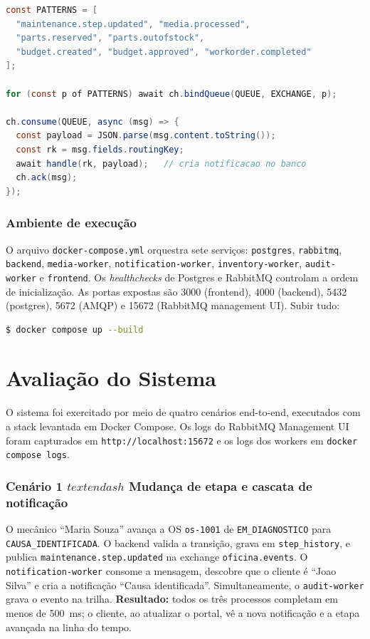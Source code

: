 \documentclass[10pt,a4paper]{article}
\begin{document}
\begin{lstlisting}[language=Java,caption={Notification worker (trecho)},label=lst:notif]
const PATTERNS = [
  "maintenance.step.updated", "media.processed",
  "parts.reserved", "parts.outofstock",
  "budget.created", "budget.approved", "workorder.completed"
];

for (const p of PATTERNS) await ch.bindQueue(QUEUE, EXCHANGE, p);

ch.consume(QUEUE, async (msg) => {
  const payload = JSON.parse(msg.content.toString());
  const rk = msg.fields.routingKey;
  await handle(rk, payload);   // cria notificacao no banco
  ch.ack(msg);
});
\end{lstlisting}

\subsubsection*{Ambiente de execu\c{c}\~ao}

O arquivo \texttt{docker-compose.yml} orquestra sete servi\c{c}os: \texttt{postgres}, \texttt{rabbitmq}, \texttt{backend}, \texttt{media-worker}, \texttt{notification-worker}, \texttt{inventory-worker}, \texttt{audit-worker} e \texttt{frontend}. Os \emph{healthchecks} de Postgres e RabbitMQ controlam a ordem de inicializa\c{c}\~ao. As portas expostas s\~ao 3000 (frontend), 4000 (backend), 5432 (postgres), 5672 (AMQP) e 15672 (RabbitMQ management UI). Subir tudo:
\begin{lstlisting}[language=bash]
$ docker compose up --build
\end{lstlisting}

\section{Avalia\c{c}\~ao do Sistema}

O sistema foi exercitado por meio de quatro cen\'arios end-to-end, executados com a stack levantada em Docker Compose. Os logs do RabbitMQ Management UI foram capturados em \texttt{http://localhost:15672} e os logs dos workers em \texttt{docker compose logs}.

\subsubsection*{Cen\'ario 1 \(textendash\) Mudan\c{c}a de etapa e cascata de notifica\c{c}\~ao}

O mec\^anico ``Maria Souza'' avan\c{c}a a OS \texttt{os-1001} de \texttt{EM\_DIAGNOSTICO} para \texttt{CAUSA\_IDENTIFICADA}. O backend valida a transi\c{c}\~ao, grava em \texttt{step\_history}, e publica \texttt{maintenance.step.updated} na exchange \texttt{oficina.events}. O \texttt{notification-worker} consome a mensagem, descobre que o cliente \'e ``Joao Silva'' e cria a notifica\c{c}\~ao ``Causa identificada''. Simultaneamente, o \texttt{audit-worker} grava o evento na trilha. \textbf{Resultado:} todos os tr\^es processos completam em menos de 500~ms; o cliente, ao atualizar o portal, v\^e a nova notifica\c{c}\~ao e a etapa avan\c{c}ada na linha do tempo.
\end{document}

